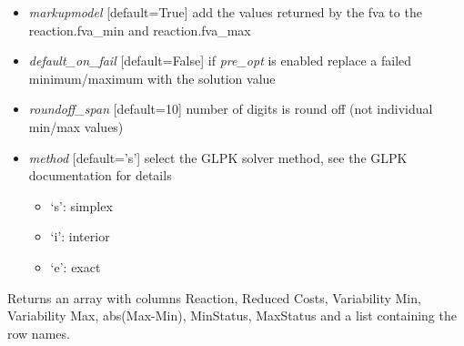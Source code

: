 \documentclass[a4paper,11pt,english]{sphinxmanual}
\begin{document}
\begin{fulllineitems}
\begin{itemize}
\item {} 
\emph{markupmodel} {[}default=True{]} add the values returned by the fva to the reaction.fva\_min and reaction.fva\_max

\item {} 
\emph{default\_on\_fail} {[}default=False{]} if \emph{pre\_opt} is enabled replace a failed minimum/maximum with the solution value

\item {} 
\emph{roundoff\_span} {[}default=10{]} number of digits is round off (not individual min/max values)

\item {} 
\emph{method} {[}default='s'{]} select the GLPK solver method, see the GLPK documentation for details
\begin{itemize}
\item {} 
`s': simplex

\item {} 
`i': interior

\item {} 
`e': exact

\end{itemize}

\end{itemize}

Returns an array with columns Reaction, Reduced Costs, Variability Min, Variability Max, abs(Max-Min), MinStatus, MaxStatus and a list containing the row names.

\end{fulllineitems}

\end{document}
